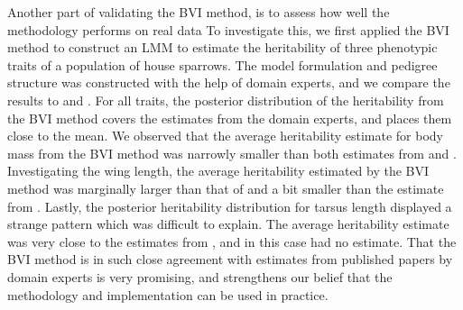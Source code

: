 Another part of validating the BVI method, is to assess how well the methodology performs on real data To investigate this, we first applied the BVI method to construct an LMM to estimate the heritability of three phenotypic traits of a population of house sparrows. The model formulation and pedigree structure was constructed with the help of domain experts, and we compare the results to \citet{Silva2017} and \citet{Muff2019Genetic}. For all traits, the posterior distribution of the heritability from the BVI method covers the estimates from the domain experts, and places them close to the mean. We observed that the average heritability estimate for body mass from the BVI method was narrowly smaller than both estimates from \citet{Silva2017} and \citet{Muff2019Genetic}. Investigating the wing length, the average heritability estimated by the BVI method was marginally larger than that of \citet{Muff2019Genetic} and a bit smaller than the estimate from \citet{Silva2017}. Lastly, the posterior heritability distribution for tarsus length displayed a strange pattern which was difficult to explain. The average heritability estimate was very close to the estimates from \citet{Silva2017}, and in this case \citet{Muff2019Genetic} had no estimate. That the BVI method is in such close agreement with estimates from published papers by domain experts is very promising, and strengthens our belief that the methodology and implementation can be used in practice.
\\
\\
